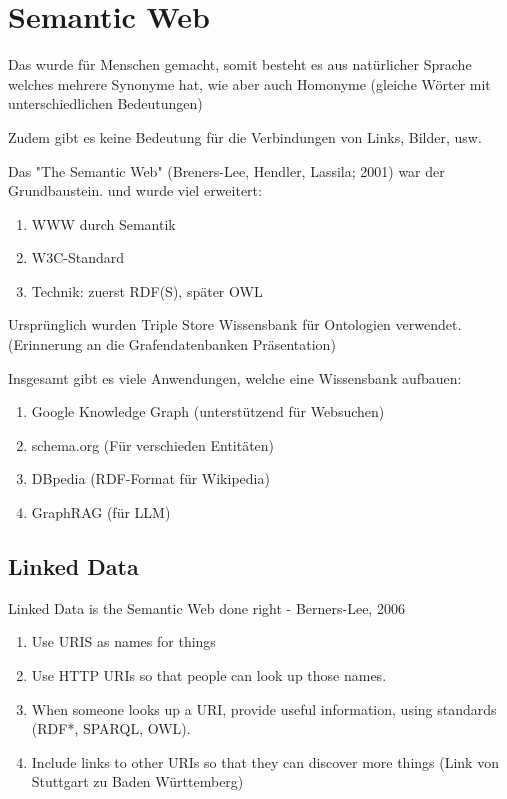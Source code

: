 \documentclass[a4paper]{article}
\title{\docTitle}
\author{Moritz}
\date{\today}
\begin{document}
\maketitle
\tableofcontents


\section{Semantic Web}

Das wurde für Menschen gemacht, somit besteht es aus natürlicher Sprache welches mehrere Synonyme hat, wie aber auch Homonyme (gleiche Wörter mit unterschiedlichen Bedeutungen)

Zudem gibt es keine Bedeutung für die Verbindungen von Links, Bilder, usw. 

Das "The Semantic Web" (Breners-Lee, Hendler, Lassila; 2001) war der Grundbaustein. und wurde viel erweitert:

\begin{enumerate}
    \item WWW durch Semantik
    \item W3C-Standard
    \item Technik: zuerst RDF(S), später OWL
\end{enumerate}

Ursprünglich wurden Triple Store Wissensbank für Ontologien verwendet. (Erinnerung an die Grafendatenbanken Präsentation)

Insgesamt gibt es viele Anwendungen, welche eine Wissensbank aufbauen:

\begin{enumerate}
    \item Google Knowledge Graph (unterstützend für Websuchen)
    \item schema.org (Für verschieden Entitäten)
    \item DBpedia (RDF-Format für Wikipedia)
    \item GraphRAG (für LLM)
\end{enumerate}

\subsection{Linked Data}

Linked Data is the Semantic Web done right - Berners-Lee, 2006

\begin{enumerate}
    \item Use URIS as names for things
    \item Use HTTP URIs so that people can look up those names.
    \item When someone looks up a URI, provide useful information, using standards (RDF*, SPARQL, OWL).
    \item Include links to other URIs so that they can discover more things (Link von Stuttgart zu Baden Württemberg)
\end{enumerate}
\end{document}

